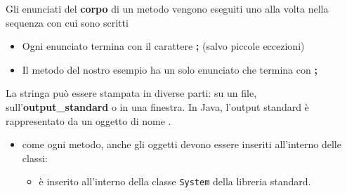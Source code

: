 \begin{frame}
\begin{block}{}
Gli enunciati del \textbf{corpo} di un metodo vengono eseguiti uno alla volta \alert{nella sequenza con cui sono scritti}
\end{block}

\begin{block}{}
\begin{itemize}
\item Ogni enunciato termina con il carattere \textbf{\alert{;}} (salvo piccole eccezioni)
\item Il metodo  del nostro esempio ha un solo enunciato che termina con \textbf{\alert{;}}
\end{itemize}
\end{block}

\begin{block}{}
La stringa  può essere stampata in diverse parti: su un file, sull'\textbf{output\_standard}
o in una finestra. In Java, l'output standard è rappresentato da un oggetto di nome .
\begin{itemize}
\item come ogni metodo, anche gli oggetti devono essere inseriti all'interno delle classi:
\begin{itemize}
\item {} è inserito all'interno della classe \texttt{System} della \alert{libreria standard}.
\end{itemize}
\end{itemize}
\end{block}
\end{frame}